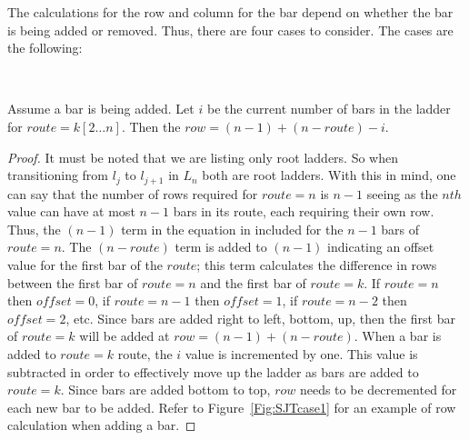 The calculations for the row and column for the bar 
depend on whether the bar is being added or removed. Thus, there are
four cases to consider. The cases are the following: 
\begin{caseof}
 ~
 ~
 ~
 ~
\end{caseof}


\begin{lemma}
  Assume a bar is being added. Let $i$ be the current number of bars in the ladder for $route=k[2 \dots n]$.
  Then the $row=(n-1)+(n-route)-i$.
\end{lemma}
\begin{proof}
   It must be noted that we are listing only root ladders. So when transitioning from 
$l_{j}$ to $l_{j+1}$ in $L_{n}$ both are root ladders. With this in mind, one can say that the 
number of rows required for $route=n$ is $n-1$ seeing as the $nth$ value can have at most $n-1$ bars in its route, 
each requiring  their own 
row. Thus, the $(n-1)$ term in the equation in included for the $n-1$ bars of 
$route=n$. The $(n-route)$ term is added to $(n-1)$ indicating 
an offset value for the first bar of the $route$; this term calculates 
the difference in rows between the first bar of $route=n$ 
and the first bar of $route=k$. If $route=n$ 
then $offset=0$, if $route=n-1$ then $offset=1$, if $route=n-2$ then $offset=2$, etc.
Since bars are added right to left, bottom, up, then the first bar of $route=k$ will be added 
at $row=(n-1)+(n-route)$. When a bar is added to $route=k$ route, the $i$ value is incremented by one. This value is subtracted in 
order to effectively move up the ladder as bars are added to $route=k$. Since bars are added 
bottom to top, $row$ needs to be decremented for each new bar to be added. Refer to Figure~\ref{Fig:SJTcase1} for an example of 
row calculation when adding a bar.
\end{proof}
